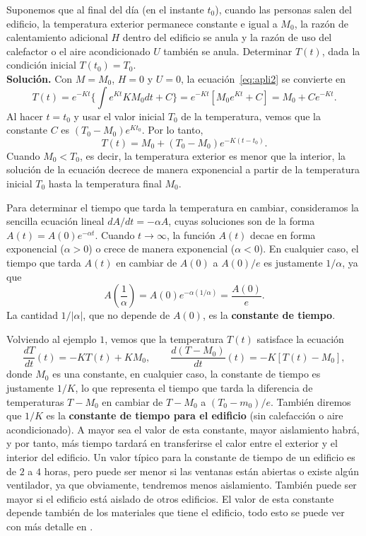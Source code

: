 \begin{ejemplo}
	Suponemos que al final del día (en el instante $t_0$), cuando las personas salen del edificio, la temperatura exterior permanece constante e igual a $M_0$, la razón de calentamiento adicional $H$ dentro del edificio se anula y la razón de uso del calefactor o el aire acondicionado $U$ también se anula. Determinar $T(t)$, dada la condición inicial $T(t_0) = T_0$.\\
	\textbf{Solución.} Con $M = M_0$, $H = 0$ y $U = 0$, la ecuación~\eqref{eq:apli2} se convierte en
	\begin{equation}
		T(t) = e^{-Kt}\{\int e^{Kt}KM_0dt+C\} = e^{-Kt}[M_0e^{Kt}+C] = M_0 + Ce^{-Kt}.
	\end{equation}
	Al hacer $t = t_0$ y usar el valor inicial $T_0$ de la temperatura, vemos que la constante $C$ es $(T_0 - M_0)e^{Kt_0}$. Por lo tanto,
	\begin{equation}
		T(t) = M_0 + (T_0 - M_0)e^{-K(t-t_0)}.
	\end{equation}
	Cuando $M_0 < T_0$, es decir, la temperatura exterior es menor que la interior, la solución de la ecuación decrece de manera exponencial a partir de la temperatura inicial $T_0$ hasta la temperatura final $M_0$.
	\begin{observacion}
		Para determinar el tiempo que tarda la temperatura en cambiar, consideramos la sencilla ecuación lineal $dA/dt = -\alpha A$, cuyas soluciones son de la forma $A(t) = A(0)e^{-\alpha t}$. Cuando $t \rightarrow \infty$, la función $A(t)$ decae en forma exponencial ($\alpha > 0$) o crece de manera exponencial ($\alpha < 0$). En cualquier caso, el tiempo que tarda $A(t)$ en cambiar de $A(0)$ a $A(0)/e$ es justamente $1/\alpha$, ya que
		\begin{equation}
			A(\dfrac{1}{\alpha}) = A(0)e^{-\alpha (1/\alpha)} = \dfrac{A(0)}{e}.
		\end{equation}
		La cantidad $1/|\alpha|$, que no depende de $A(0)$, es la \textbf{constante de tiempo}.
	\end{observacion}
	Volviendo al ejemplo $1$, vemos que la temperatura $T(t)$ satisface la ecuación
	\begin{equation}
		\dfrac{dT}{dt}(t) = -KT(t)+KM_0, \qquad \dfrac{d(T-M_0)}{dt}(t) = -K[T(t)-M_0],
	\end{equation}
	donde $M_0$ es una constante, en cualquier caso, la constante de tiempo es justamente $1/K$, lo que representa el tiempo que tarda la diferencia de temperaturas $T-M_0$ en cambiar de $T-M_0$ a $(T_0 - m_0)/e$. También diremos que $1/K$ es la \textbf{constante de tiempo para el edificio} (sin calefacción o aire acondicionado). A mayor sea el valor de esta constante, mayor aislamiento habrá, y por tanto, más tiempo tardará en transferirse el calor entre el exterior y el interior del edificio. Un valor típico para la constante de tiempo de un edificio es de $2$ a $4$ horas, pero puede ser menor si las ventanas están abiertas o existe algún ventilador, ya que obviamente, tendremos menos aislamiento. También puede ser mayor si el edificio está aislado de otros edificios. El valor de esta constante depende también de los materiales que tiene el edificio, todo esto se puede ver con más detalle en \cite{tfm}.
	

\end{ejemplo}
